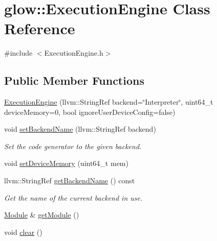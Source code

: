 \hypertarget{classglow_1_1_execution_engine}{}\section{glow\+:\+:Execution\+Engine Class Reference}
\label{classglow_1_1_execution_engine}


{\ttfamily \#include $<$Execution\+Engine.\+h$>$}

\subsection*{Public Member Functions}
\begin{DoxyCompactItemize}
\item 
\hyperlink{classglow_1_1_execution_engine_ad438cf3b34468a43b1d62cf1975635e0}{Execution\+Engine} (llvm\+::\+String\+Ref backend=\char`\"{}Interpreter\char`\"{}, uint64\+\_\+t device\+Memory=0, bool ignore\+User\+Device\+Config=false)
\item 
void \hyperlink{classglow_1_1_execution_engine_a35c2e984e60f079f6209de74d903f9a0}{set\+Backend\+Name} (llvm\+::\+String\+Ref backend)
\begin{DoxyCompactList}\small\item\em Set the code generator to the given {\ttfamily backend}. \end{DoxyCompactList}\item 
void \hyperlink{classglow_1_1_execution_engine_aaf3231329fb5af46bfe5e37457ddf0cb}{set\+Device\+Memory} (uint64\+\_\+t mem)
\item 
\mbox{\label{classglow_1_1_execution_engine_a7f4383a21f01fa1163af96e9498638b2}} 
llvm\+::\+String\+Ref \hyperlink{classglow_1_1_execution_engine_a7f4383a21f01fa1163af96e9498638b2}{get\+Backend\+Name} () const
\begin{DoxyCompactList}\small\item\em Get the name of the current backend in use. \end{DoxyCompactList}\item 
\hyperlink{classglow_1_1_module}{Module} \& \hyperlink{classglow_1_1_execution_engine_a3ba6de88789f0caaf7fd777f21462729}{get\+Module} ()
\item 
\mbox{\label{classglow_1_1_execution_engine_a6f85b8fa2a571f457933619f1592a281}} 
void \hyperlink{classglow_1_1_execution_engine_a6f85b8fa2a571f457933619f1592a281}{clear} ()

\end{DoxyCompactItemize}
